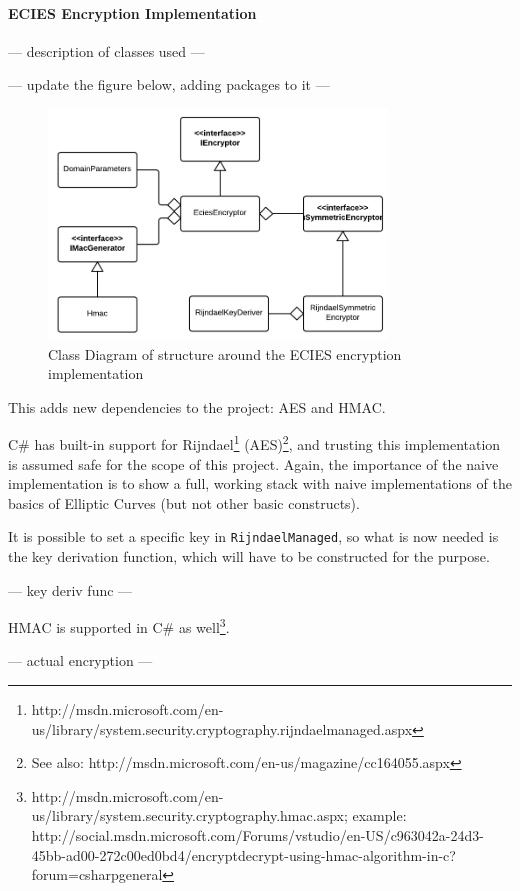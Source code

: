 \paragraph{ECIES Encryption Implementation}

--- description of classes used ---

--- update the figure below, adding packages to it ---

\begin{figure}[ht!]
	\centering
	\includegraphics[width=90mm]{img/naive_implementation__encryption__ecies_class_diagram.png}
	\caption{Class Diagram of structure around the ECIES encryption implementation}
	\label{ecies_class_diagram}
\end{figure}

This adds new dependencies to the project: AES and HMAC.

C\# has built-in support for Rijndael\footnote{http://msdn.microsoft.com/en-us/library/system.security.cryptography.rijndaelmanaged.aspx}
(AES)\footnote{See also: http://msdn.microsoft.com/en-us/magazine/cc164055.aspx}, and trusting this implementation is assumed safe for
the scope of this project. Again, the importance of the naive implementation is to show a full, working stack with naive implementations
of the basics of Elliptic Curves (but not other basic constructs).

It is possible to set a specific key in \verb+RijndaelManaged+, so what is now needed is the key derivation function, which will have to
be constructed for the purpose.

--- key deriv func ---

HMAC is supported in C\# as well\footnote{http://msdn.microsoft.com/en-us/library/system.security.cryptography.hmac.aspx; example: http://social.msdn.microsoft.com/Forums/vstudio/en-US/c963042a-24d3-45bb-ad00-272c00ed0bd4/encryptdecrypt-using-hmac-algorithm-in-c?forum=csharpgeneral}.

--- actual encryption ---